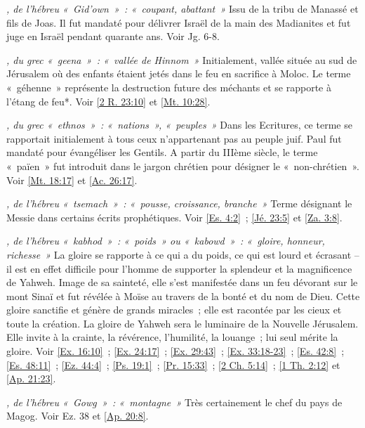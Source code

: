 \begin{multicols}{2}
\textit{, de l'hébreu «~Gid'own~»~: «~coupant, abattant~»}\newline
Issu de la tribu de Manassé et fils de Joas. Il fut mandaté pour délivrer Israël de la main des Madianites et fut juge en Israël pendant quarante ans. Voir Jg. 6-8.

\textit{, du grec «~geena~»~: «~vallée de Hinnom~»}\newline
Initialement, vallée située au sud de Jérusalem où des enfants étaient jetés dans le feu en sacrifice à Moloc. Le terme «~géhenne~» représente la destruction future des méchants et se rapporte à l'étang de feu*. Voir \vref{2 R. 23:10} et \vref{Mt. 10:28}.

\textit{, du grec «~ethnos~»~: «~nations~», «~peuples~»}\newline
Dans les Ecritures, ce terme se rapportait initialement à tous ceux n'appartenant pas au peuple juif. Paul fut mandaté pour évangéliser les Gentils. A partir du IIIème siècle, le terme «~païen~» fut introduit dans le jargon chrétien pour désigner le «~non-chrétien~». Voir \vref{Mt. 18:17} et \vref{Ac. 26:17}.

\textit{, de l'hébreu «~tsemach~»~: «~pousse, croissance, branche~»}\newline
Terme désignant le Messie dans certains écrits prophétiques. Voir \vref{Es. 4:2}~; \vref{Jé. 23:5} et \vref{Za. 3:8}.

\textit{, de l'hébreu «~kabhod~»~: «~poids~» ou «~kabowd~»~: «~gloire, honneur, richesse~»}\newline
La gloire se rapporte à ce qui a du poids, ce qui est lourd et écrasant – il est en effet difficile pour l'homme de supporter la splendeur et la magnificence de Yahweh. Image de sa sainteté, elle s'est manifestée dans un feu dévorant sur le mont Sinaï et fut révélée à Moïse au travers de la bonté et du nom de Dieu. Cette gloire sanctifie et génère de grands miracles~; elle est racontée par les cieux et toute la création. La gloire de Yahweh sera le luminaire de la Nouvelle Jérusalem. Elle invite à la crainte, la révérence, l'humilité, la louange~; lui seul mérite la gloire. Voir \vref{Ex. 16:10}~; \vref{Ex. 24:17}~; \vref{Ex. 29:43}~; \vref{Ex. 33:18-23}~; \vref{Es. 42:8}~; \vref{Es. 48:11}~; \vref{Ez. 44:4}~; \vref{Ps. 19:1}~; \vref{Pr. 15:33}~; \vref{2 Ch. 5:14}~; \vref{1 Th. 2:12} et \vref{Ap. 21:23}.

\textit{, de l'hébreu «~Gowg~»~: «~montagne~»}\newline
Très certainement le chef du pays de Magog. Voir Ez. 38 et \vref{Ap. 20:8}.


\end{multicols}

